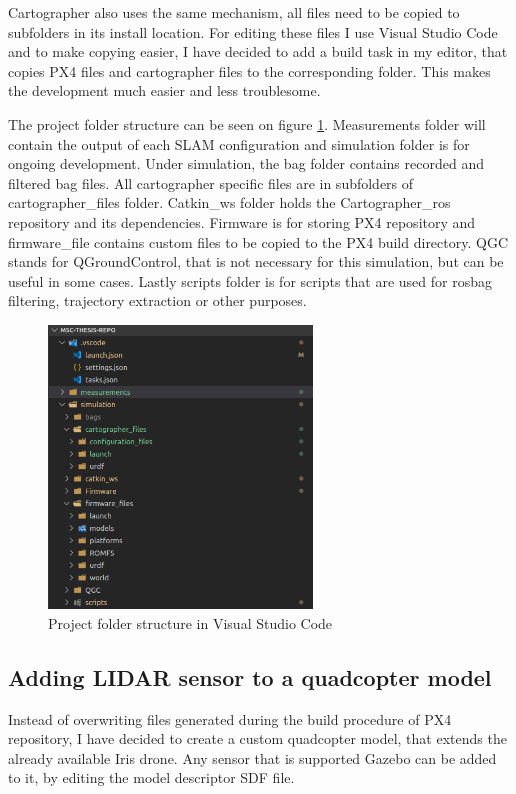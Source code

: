 Cartographer also uses the same mechanism, all files need to be copied to subfolders in its install 
location. For editing these files I use Visual Studio Code and to make copying easier, I have decided 
to add a build task in my editor, that copies PX4 files and cartographer files to the corresponding folder.
This makes the development much easier and less troublesome.

The project folder structure can be seen on figure \ref{fig:vscode_folder_structure}. Measurements folder 
will contain the output of each SLAM configuration and simulation folder is for ongoing development. Under
simulation, the bag folder contains recorded and filtered bag files. All cartographer specific files are in
subfolders of cartographer\_files folder. 
Catkin\_ws folder holds the Cartographer\_ros repository and its 
dependencies. Firmware is for storing PX4 repository and firmware\_file contains custom files to be copied
to the PX4 build directory. QGC stands for QGroundControl, that is not necessary for this simulation, but
can be useful in some cases. Lastly scripts folder is for scripts that are used for rosbag filtering, 
trajectory extraction or other purposes.


\begin{figure}[!ht]
    \centering
    \includegraphics[width=70mm, keepaspectratio]{figures/vscode_folder_structure.png}
    \caption{Project folder structure in Visual Studio Code}
    \label{fig:vscode_folder_structure}
\end{figure}


\subsection{Adding LIDAR sensor to a quadcopter model}
Instead of overwriting files generated during the build procedure of PX4 repository, I have decided to 
create a custom quadcopter model, that extends the already available Iris drone. Any sensor that is 
supported Gazebo can be added to it, by editing the model descriptor SDF file. 

